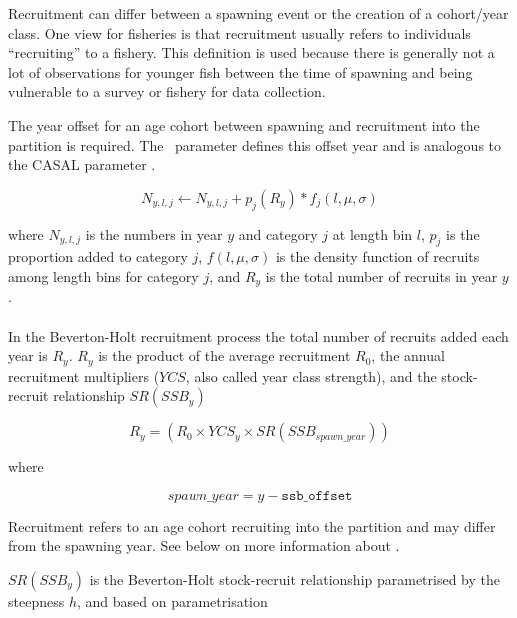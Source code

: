 Recruitment can differ between a spawning event or the creation of a cohort/year class. One view for fisheries is that recruitment usually refers to individuals \enquote{recruiting} to a fishery. This definition is used because there is generally not a lot of observations for younger fish between the time of spawning and being vulnerable to a survey or fishery for data collection.

The year offset for an age cohort between spawning and recruitment into the partition is required. The \CNAME\ parameter  defines this offset year and is analogous to the CASAL parameter .

\begin{equation}
N_{y,l,j} \leftarrow N_{y,l,j} + p_j(R_y) * f_j(l,\mu, \sigma)
\end{equation}

where $N_{y,l,j}$ is the numbers in year $y$ and category $j$ at length bin $l$, $p_j$ is the proportion added to category $j$, \(f(l,\mu, \sigma)\) is the density function of recruits among length bins for category \(j\), and $R_y$ is the total number of recruits in year $y$.


\paragraph{}\label{sec:Process-Length-RecruitmentBevertonHolt}

In the Beverton-Holt recruitment process the total number of recruits added each year is $R_y$. $R_y$ is the product of the average recruitment $R_0$, the annual recruitment multipliers ($YCS$, also called year class strength), and the stock-recruit relationship $SR(SSB_y)$


\begin{equation}\label{eq:BH}
R_{y} = (R_0 \times YCS_{y} \times SR(SSB_{spawn\_year}))
\end{equation}

where

\begin{equation}\label{eq:year_class}
spawn\_year = y - \texttt{ssb\_offset}
\end{equation}

Recruitment refers to an age cohort recruiting into the partition and may differ from the spawning year. See below on more information about .

$SR(SSB_y)$ is the Beverton-Holt stock-recruit relationship parametrised by the steepness $h$, and based on \cite{mace_doonan_88} parametrisation

